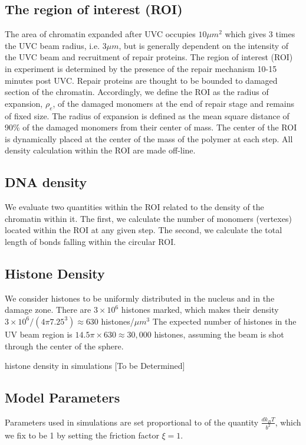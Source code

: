 \documentclass[12pt]{report}
\begin{document}
	\subsection{The region of interest (ROI)}
     The area of chromatin expanded after UVC occupies $10 \mu m^2$ which gives 3 times the UVC beam radius, i.e. $3\mu m$, but is generally dependent on the intensity of the UVC beam and recruitment of repair proteins. 
     The region of interest (ROI) in experiment is determined by the presence of the repair mechanism 10-15 minutes post UVC. Repair proteins are thought to be bounded to damaged section of the chromatin. Accordingly, we define the ROI as the radius of expansion, $\rho_e$, of the damaged monomers at the end of repair stage and remains of fixed size. The radius of expansion is defined as the mean square distance of 90\% of the damaged monomers from their center of mass. 
     The center of the ROI is dynamically placed at the center of the mass of the polymer at each step. All density calculation within the ROI are made off-line. 
	
	\subsection{DNA density}
    We evaluate two quantities within the ROI related to the density of the chromatin within it. The first, we calculate the number of monomers (vertexes) located within the ROI at any given step. The second, we calculate the total length of bonds falling within the circular ROI.
	
    \subsection{Histone Density}
		We consider histones to be uniformly distributed in the nucleus and in the damage zone. There are $3\times 10^6$ histones marked, which makes their density $3\times 10^6 /(4 \pi 7.25^3)\approx 630$ histones/$\mu m^3$
		The expected number of histones in the UV beam region is $14.5\pi \times 630\approx 30,000$ histones, assuming the beam is shot through the center of the sphere. 
		
		histone density in simulations [To be Determined]
        						         
    \subsection{Model Parameters}
      Parameters used in simulations are set proportional to of the quantity $\frac{dk_BT}{b^2}$, which we fix to be 1 by setting the friction factor $\xi=1$. 
\end{document}
